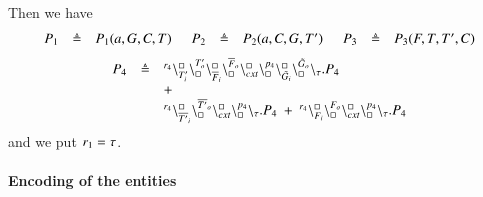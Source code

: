 Then we have 
\[
\begin{array}{lcl @{\hspace{0.5cm}}lcl @{\hspace{0.5cm}}lcl }
P_1 & \defeq & P_1(a,G,C,T) &   P_2 & \defeq & P_2(a,C,G,T') &   P_3 & \defeq & P_3(F,T,T',C)  \\
\end{array}
\]
\[
\begin{array}{lcl}
P_4 & \defeq &\startchain{r_4}\chainedlink{T'_i}{\noact}\chainedlink{\noact}{T'_o}
                                                     \chainedlink{\overline{F}_i}{\noact}\chainedlink{\noact}{\overline{F}_o}
					        \chainedlink{cxt}{\noact}\chainedlink{\noact}{p_4}
					        \chainedlink{\tilde{G}_i}{\noact}\chainedlink{\noact}{\tilde{G}_o}
			\chainend{\silent}.P_4  \\
				&& +\\
&&\startchain{r_4}\chainedlink{\overline{T'}_i}{\noact}\chainedlink{\noact}{\overline{T'}_o}\chainedlink{cxt}{\noact}\chainedlink{\noact}{p_4} \chainend{\silent}.P_4 \ +\  \startchain{r_4}\chainedlink{F_i}{\noact}\chainedlink{\noact}{F_o}\chainedlink{cxt}{\noact}\chainedlink{\noact}{p_4} \chainend{\silent}.P_4
\end{array}
\]
\noindent
and we put $r_1 = \tau$.

\paragraph{Encoding of the entities}

